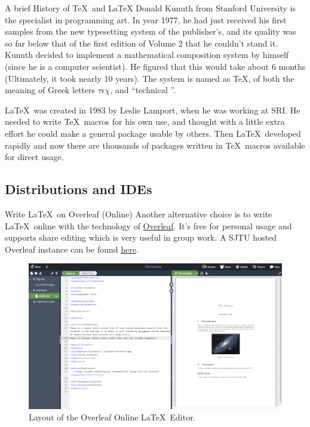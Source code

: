 \begin{frame}{A brief History of \TeX\ and \LaTeX}
    Donald Kunuth from Stanford University is the specialist in programming art. In year 1977, he had just received his first samples from the new typesetting system of the publisher's, and its quality was so far below that of the first edition of Volume 2 that he couldn't stand it. Kunuth decided to implement a mathematical composition system by himself (since he is a computer scientist). He figured that this would take about 6 months (Ultimately, it took nearly 10 years). The system is named as \TeX, of both the meaning of Greek letters $\tau\epsilon\chi$, and ``technical ''. \medskip

    \LaTeX\ was created in 1983 by Leslie Lamport, when he was working at SRI. He needed to write \TeX\ macros for his own use, and thought with a little extra effort he could make a general package usable by others. Then \LaTeX\  developed rapidly and now there are thousands of packages written in \TeX\ macros available for direct usage.

\end{frame}

\subsection{Distributions and IDEs}

\begin{frame}{Write \LaTeX\ on Overleaf (Online)}
    Another alternative choice is to write \LaTeX\ online with the technology of \href{https://www.overleaf.com/}{Overleaf}.
    It's free for personal usage and supports share editing which is very useful in group work.
    A SJTU hosted Overleaf instance can be found \href{https://latex.sjtu.edu.cn/}{here}.
    \begin{figure}
        \centering
        \includegraphics[width=0.6\linewidth]{../intro/overleaf.png}
        \caption{Layout of the Overleaf Online \LaTeX\ Editor.}
    \end{figure}
\end{frame}


